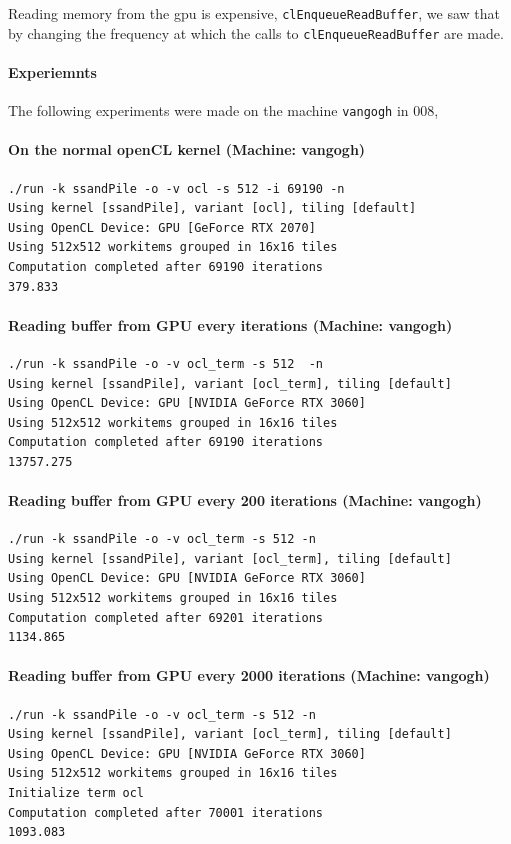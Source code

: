 \documentclass{report}
\newcommand{\code}[1]{\texttt{#1}}
\begin{document}
Reading memory from the gpu is expensive, \code{clEnqueueReadBuffer},
we saw that by changing the frequency at which the calls to \code{clEnqueueReadBuffer} are
made.

\paragraph{Experiemnts} The following experiments were made on the machine \texttt{vangogh}
in $008$,

\paragraph{On the normal openCL kernel (Machine: vangogh)}
\begin{verbatim}
./run -k ssandPile -o -v ocl -s 512 -i 69190 -n
Using kernel [ssandPile], variant [ocl], tiling [default]
Using OpenCL Device: GPU [GeForce RTX 2070]
Using 512x512 workitems grouped in 16x16 tiles
Computation completed after 69190 iterations
379.833
\end{verbatim}

\paragraph{Reading buffer from GPU every iterations (Machine: vangogh)}
\begin{verbatim}
./run -k ssandPile -o -v ocl_term -s 512  -n
Using kernel [ssandPile], variant [ocl_term], tiling [default]
Using OpenCL Device: GPU [NVIDIA GeForce RTX 3060]
Using 512x512 workitems grouped in 16x16 tiles 
Computation completed after 69190 iterations
13757.275 
\end{verbatim}

\paragraph{Reading buffer from GPU every 200 iterations (Machine: vangogh)}
\begin{verbatim}
./run -k ssandPile -o -v ocl_term -s 512 -n
Using kernel [ssandPile], variant [ocl_term], tiling [default]
Using OpenCL Device: GPU [NVIDIA GeForce RTX 3060]
Using 512x512 workitems grouped in 16x16 tiles 
Computation completed after 69201 iterations
1134.865 
\end{verbatim}

\paragraph{Reading buffer from GPU every 2000 iterations (Machine: vangogh)}
\begin{verbatim}
./run -k ssandPile -o -v ocl_term -s 512 -n
Using kernel [ssandPile], variant [ocl_term], tiling [default]
Using OpenCL Device: GPU [NVIDIA GeForce RTX 3060]
Using 512x512 workitems grouped in 16x16 tiles 
Initialize term ocl
Computation completed after 70001 iterations
1093.083 
\end{verbatim}
\end{document}
